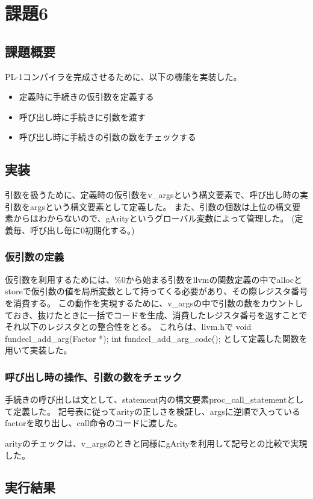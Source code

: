 \section{課題6}
\subsection{課題概要}
PL-1コンパイラを完成させるために、以下の機能を実装した。
\begin{itemize}
  \item 定義時に手続きの仮引数を定義する
  \item 呼び出し時に手続きに引数を渡す
  \item 呼び出し時に手続きの引数の数をチェックする
\end{itemize}

\subsection{実装}
引数を扱うために、定義時の仮引数をv\_argsという構文要素で、呼び出し時の実引数をargsという構文要素として定義した。
また、引数の個数は上位の構文要素からはわからないので、gArityというグローバル変数によって管理した。
(定義毎、呼び出し毎に0初期化する。)

\subsubsection{仮引数の定義}
仮引数を利用するためには、\%0から始まる引数をllvmの関数定義の中でallocとstoreで仮引数の値を局所変数として持ってくる必要があり、その際レジスタ番号を消費する。
この動作を実現するために、v\_argsの中で引数の数をカウントしておき、抜けたときに一括でコードを生成、消費したレジスタ番号を返すことでそれ以下のレジスタとの整合性をとる。
これらは、llvm.hで void fundecl\_add\_arg(Factor *); int fundecl\_add\_arg\_code(); として定義した関数を用いて実装した。

\subsubsection{呼び出し時の操作、引数の数をチェック}
手続きの呼び出しは文として、statement内の構文要素proc\_call\_statementとして定義した。
記号表に従ってarityの正しさを検証し、argsに逆順で入っているfactorを取り出し、call命令のコードに渡した。

arityのチェックは、v\_argsのときと同様にgArityを利用して記号との比較で実現した。

\subsection{実行結果}
